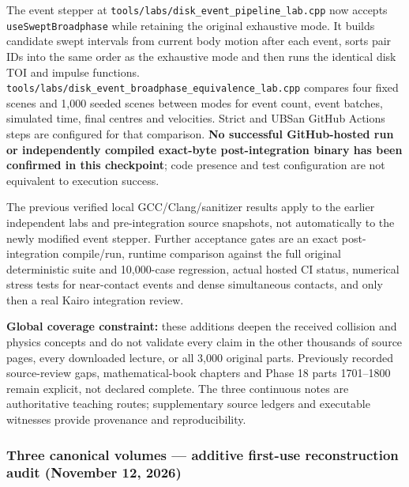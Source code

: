 The event stepper at \texttt{tools/labs/disk\_event\_pipeline\_lab.cpp} now accepts \texttt{useSweptBroadphase} while retaining the original exhaustive mode. It builds candidate swept intervals from current body motion after each event, sorts pair IDs into the same order as the exhaustive mode and then runs the identical disk TOI and impulse functions. \texttt{tools/labs/disk\_event\_broadphase\_equivalence\_lab.cpp} compares four fixed scenes and 1,000 seeded scenes between modes for event count, event batches, simulated time, final centres and velocities. Strict and UBSan GitHub Actions steps are configured for that comparison. \textbf{No successful GitHub-hosted run or independently compiled exact-byte post-integration binary has been confirmed in this checkpoint}; code presence and test configuration are not equivalent to execution success.

The previous verified local GCC/Clang/sanitizer results apply to the earlier independent labs and pre-integration source snapshots, not automatically to the newly modified event stepper. Further acceptance gates are an exact post-integration compile/run, runtime comparison against the full original deterministic suite and 10,000-case regression, actual hosted CI status, numerical stress tests for near-contact events and dense simultaneous contacts, and only then a real Kairo integration review.

\textbf{Global coverage constraint:} these additions deepen the received collision and physics concepts and do not validate every claim in the other thousands of source pages, every downloaded lecture, or all 3,000 original parts. Previously recorded source-review gaps, mathematical-book chapters and Phase 18 parts 1701--1800 remain explicit, not declared complete. The three continuous notes are authoritative teaching routes; supplementary source ledgers and executable witnesses provide provenance and reproducibility.

\subsubsection{Three canonical volumes --- additive first-use reconstruction audit (November 12, 2026)}\label{appendix-3b67654799a2-three-canonical-volumes-additive-first-use-reconstruction-audit-november-12-2026}

